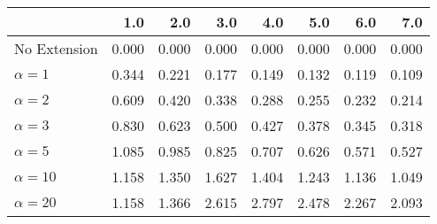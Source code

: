\begin{tabular}{lrrrrrrr}
\toprule
{} &   1.0 &   2.0 &   3.0 &   4.0 &   5.0 &   6.0 &   7.0 \\
\midrule
No Extension  & 0.000 & 0.000 & 0.000 & 0.000 & 0.000 & 0.000 & 0.000 \\
$\alpha = 1$  & 0.344 & 0.221 & 0.177 & 0.149 & 0.132 & 0.119 & 0.109 \\
$\alpha = 2$  & 0.609 & 0.420 & 0.338 & 0.288 & 0.255 & 0.232 & 0.214 \\
$\alpha = 3$  & 0.830 & 0.623 & 0.500 & 0.427 & 0.378 & 0.345 & 0.318 \\
$\alpha = 5$  & 1.085 & 0.985 & 0.825 & 0.707 & 0.626 & 0.571 & 0.527 \\
$\alpha = 10$ & 1.158 & 1.350 & 1.627 & 1.404 & 1.243 & 1.136 & 1.049 \\
$\alpha = 20$ & 1.158 & 1.366 & 2.615 & 2.797 & 2.478 & 2.267 & 2.093 \\
\bottomrule
\end{tabular}
